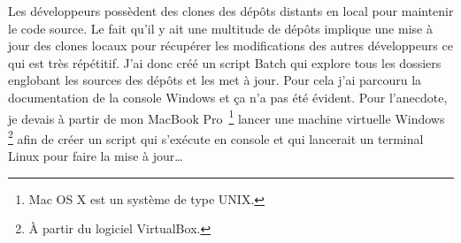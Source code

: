 Les développeurs possèdent des clones des dépôts distants en local pour
maintenir le code source. Le fait qu'il y ait une multitude de dépôts
implique une mise à jour des clones locaux pour récupérer les
modifications des autres développeurs ce qui est très répétitif. J'ai
donc créé un script Batch qui explore tous les dossiers englobant les
sources des dépôts et les met à jour. Pour cela j'ai parcouru la
documentation de la console Windows et ça n'a pas été évident.  Pour
l'anecdote, je devais à partir de mon MacBook Pro\, \footnote{Mac OS X
est un système de type UNIX.} lancer une machine virtuelle Windows\,
\footnote{À partir du logiciel VirtualBox.} afin de créer un script qui
s'exécute en console et qui lancerait un terminal Linux pour faire la
mise à jour\dots
